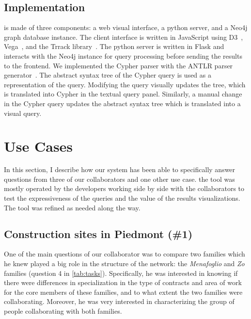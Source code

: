 \subsection{Implementation}

\name is made of three components: a web visual interface, a python server, and a Neo4j\cite{neo4j} graph database instance.
The client interface is written in JavaScript using D3~\cite{d3}, Vega~\cite{satyanarayan2016vega}, and the Trrack library~\cite{cutlerTrrackLibraryProvenanceTracking2020}.
The python server is written in Flask and interacts with the Neo4j instance for query processing before sending the results to the frontend.
We implemented the Cypher parser with the ANTLR parser generator~\cite{parr1995antlr}.
The abstract syntax tree of the Cypher query is used as a representation of the query.
Modifying the query visually updates the tree, which is translated into Cypher in the textual query panel.
Similarly, a manual change in the Cypher query updates the abstract syntax tree which is translated into a visual query.



\section{Use Cases}\label{sec:combinet-usecases}

In this section, I describe how our system has been able to specifically answer questions from three of our collaborators and one other use case.
the tool was mostly operated by the developers working side by side with the collaborators to test the expressiveness of the queries and the value of the results visualizations.
The tool was refined as needed along the way.


\subsection{Construction sites in Piedmont (\#1)}

One of the main questions of our collaborator was to compare two families which he knew played a big role in the structure of the network: the \textit{Menafoglio} and \textit{Zo} families (question 4 in \autoref{tab:tasks}).
Specifically, he was interested in knowing if there were differences in specialization in the type of contracts and area of work for the core members of these families, and to what extent the two families were collaborating.
Moreover, he was very interested in characterizing the group of people collaborating with both families.

